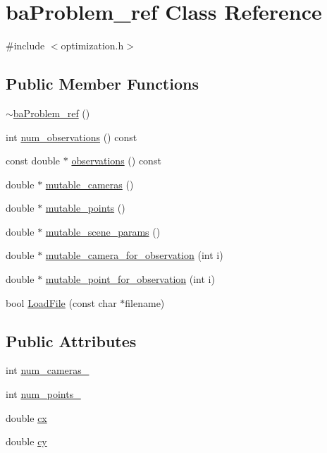 \hypertarget{classbaProblem__ref}{\section{ba\-Problem\-\_\-ref Class Reference}
\label{d2/d3f/classbaProblem__ref}
}


{\ttfamily \#include $<$optimization.\-h$>$}

\subsection*{Public Member Functions}
\begin{DoxyCompactItemize}
\item 
\hyperlink{classbaProblem__ref_a8eb852f63eb07f0c699eb21c1aa99ebb}{$\sim$ba\-Problem\-\_\-ref} ()
\item 
int \hyperlink{classbaProblem__ref_a0c4fae03745061e468c90f31bb3c3a36}{num\-\_\-observations} () const 
\item 
const double $\ast$ \hyperlink{classbaProblem__ref_a80cd1a4c54c8dd32cc183da7c94d1e56}{observations} () const 
\item 
double $\ast$ \hyperlink{classbaProblem__ref_a90468afc78c2e244364fe218a53392af}{mutable\-\_\-cameras} ()
\item 
double $\ast$ \hyperlink{classbaProblem__ref_a926b72fd733cd727a98faf38748b0c73}{mutable\-\_\-points} ()
\item 
double $\ast$ \hyperlink{classbaProblem__ref_a63109b77ebee946d9c278a6124447221}{mutable\-\_\-scene\-\_\-params} ()
\item 
double $\ast$ \hyperlink{classbaProblem__ref_ad8a8ec7cd0449706b6472dbb2637d86a}{mutable\-\_\-camera\-\_\-for\-\_\-observation} (int i)
\item 
double $\ast$ \hyperlink{classbaProblem__ref_afabc124e4d51af38b22cd82ba456c524}{mutable\-\_\-point\-\_\-for\-\_\-observation} (int i)
\item 
bool \hyperlink{classbaProblem__ref_ad8d56df86b80e06a25ea4759b7a46196}{Load\-File} (const char $\ast$filename)
\end{DoxyCompactItemize}
\subsection*{Public Attributes}
\begin{DoxyCompactItemize}
\item 
int \hyperlink{classbaProblem__ref_aa66f29e12cd960cab710165a755f0b35}{num\-\_\-cameras\-\_\-}
\item 
int \hyperlink{classbaProblem__ref_a970268458224931ac624358248d1a7cc}{num\-\_\-points\-\_\-}
\item 
double \hyperlink{classbaProblem__ref_a7f8a2c3626cbd11ac8aba36d8fb24558}{cx}
\item 
double \hyperlink{classbaProblem__ref_a6dd08234b8f251edf79d66d2f800a905}{cy}
\end{DoxyCompactItemize}


